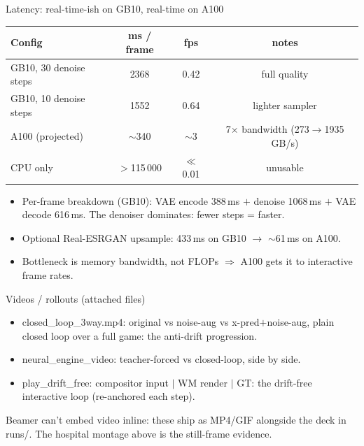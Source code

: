 \documentclass[aspectratio=169,11pt]{beamer}
\newcommand{\code}[1]{{\ttfamily\small #1}}
\newcommand{\good}[1]{\textcolor{good}{#1}}
\newcommand{\bad}[1]{\textcolor{acc}{#1}}
\begin{document}
\begin{frame}{Latency: real-time-ish on GB10, real-time on A100}
  \centering
  \small
  \begin{tabular}{lccc}
    \toprule
    \textbf{Config} & \textbf{ms / frame} & \textbf{fps} & \textbf{notes} \\
    \midrule
    GB10, 30 denoise steps & 2368 & 0.42 & full quality \\
    GB10, 10 denoise steps & 1552 & 0.64 & lighter sampler \\
    \good{A100 (projected)} & \good{$\sim$340} & \good{$\sim$3} & 7$\times$ bandwidth (273$\to$1935 GB/s) \\
    CPU only               & $>$115\,000 & $\ll$0.01 & unusable \\
    \bottomrule
  \end{tabular}
  \vspace{0.5em}
  \begin{itemize}\scriptsize
    \item Per-frame breakdown (GB10): VAE encode 388\,ms $+$ denoise 1068\,ms $+$
          VAE decode 616\,ms. The \bad{denoiser} dominates: fewer steps = faster.
    \item Optional Real-ESRGAN upsample: 433\,ms on GB10 $\to$ $\sim$61\,ms on A100.
    \item Bottleneck is memory bandwidth, not FLOPs $\Rightarrow$ A100 gets it to
          interactive frame rates.
  \end{itemize}
\end{frame}

\begin{frame}{Videos / rollouts (attached files)}
  \centering
  \begin{itemize}\small
    \item \code{closed\_loop\_3way.mp4}: original vs noise-aug vs x-pred$+$noise-aug,
          plain closed loop over a full game: the anti-drift progression.
    \item \code{neural\_engine\_video}: teacher-forced vs closed-loop, side by side.
    \item \code{play\_drift\_free}: compositor input $\mid$ WM render $\mid$ GT: the
          drift-free interactive loop (re-anchored each step).
  \end{itemize}
  \vspace{0.6em}
  {\scriptsize Beamer can't embed video inline: these ship as MP4/GIF alongside the
  deck in \code{runs/}. The hospital montage above is the still-frame evidence.}
\end{frame}
\end{document}
